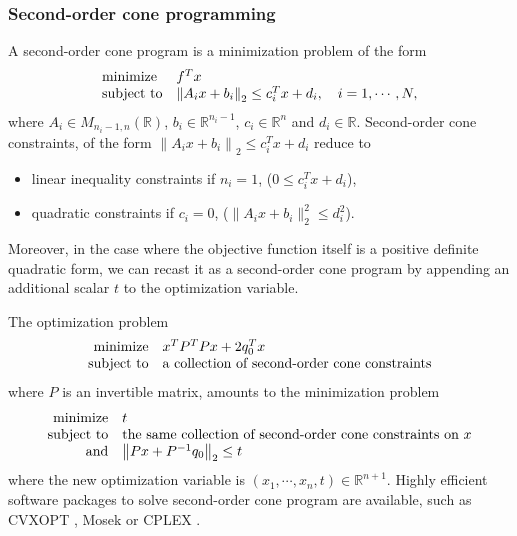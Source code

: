 \documentclass[a4paper]{article}
\newcommand{\1}{\textbf{1}}
\newcommand{\R}{\mathbb{R}}
\begin{document}
\subsubsection*{Second-order cone programming}
\par \noindent A second-order cone program is a minimization problem of the form
\begin{equation}\label{eq:socp}
\begin{array}{ll}
\textnormal{minimize}	& f^T x\\
\textnormal{subject to} & \left\| A_i x + b_i \right\|_2 \leq c_i^T x + d_i, \quad i =1, \cdots, N,
\end{array}
\end{equation}
where $A_i \in M_{n_i-1,n}(\R)$, $b_i \in \R^{n_i-1}$, $c_i \in \R^n$ and $d_i \in \R$. Second-order cone constraints, of the form $\left\| A_i x + b_i \right\|_2 \leq c_i^T x + d_i$ reduce to
\begin{itemize}
\item linear inequality constraints if $n_i = 1$, ($0 \leq c_i^T x + d_i$),
\item quadratic constraints if $c_i = 0$, ($\| A_i x + b_i \|_2^2 \leq d_i^2$). 
\end{itemize}
\par \noindent Moreover, in the case where the objective function itself is a positive definite quadratic form, we can recast it as a second-order cone program by appending an additional scalar $t$ to the optimization variable.
\par \noindent The optimization problem
$$
\begin{array}{rl}
\textnormal{minimize}	& x^T P^T P x + 2 q_0^T x\\
\textnormal{subject to} & \textnormal{a collection of second-order cone constraints}
\end{array}
$$
where $P$ is an invertible matrix, amounts to the minimization problem
$$
\begin{array}{rl}
\textnormal{minimize}	& t\\
\textnormal{subject to} & \textnormal{the same collection of second-order cone constraints on} \ x\\
\textnormal{and}		& \left\| P x + P^{-1} q_0 \right\|_2 \leq t
\end{array}
$$
where the new optimization variable is $\left(x_1, \cdots, x_n, t\right) \in \R^{n+1}$. Highly efficient software packages to solve second-order cone program are available, such as CVXOPT \cite{cvxopt}, Mosek \cite{mosek} or CPLEX \cite{ilogcplex}.
\end{document}
